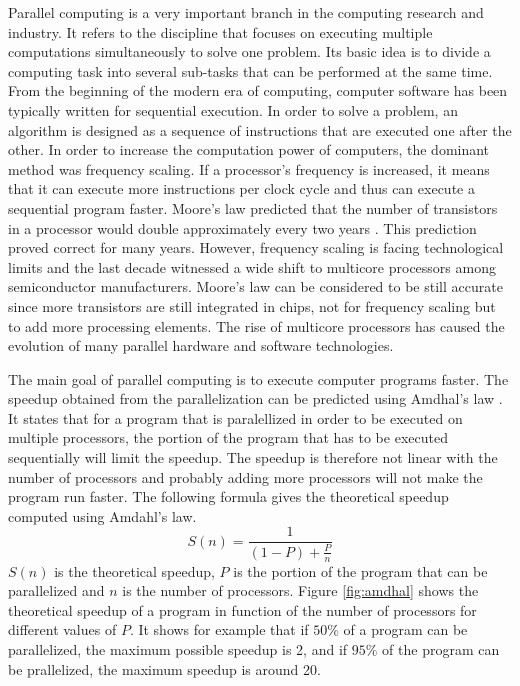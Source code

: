 Parallel computing is a very important branch in the computing research and industry. It refers to the discipline that focuses on executing multiple computations simultaneously to solve one problem. Its basic idea is to divide a computing task into several sub-tasks that can be performed at the same time. From the beginning of the modern era of computing, computer software has been typically written for sequential execution. In order to solve a problem, an algorithm is designed as a sequence of instructions that are executed one after the other. In order to increase the computation power of computers, the dominant method was frequency scaling. If a processor's frequency is increased, it means that it can execute more instructions per clock cycle and thus can execute a sequential program faster. Moore's law predicted that the number of transistors in a processor would double approximately every two years \cite{moore:1965}. This prediction proved correct for many years. However, frequency scaling is facing technological limits and the last decade witnessed a wide shift to multicore processors among semiconductor manufacturers. Moore's law can be considered to be still accurate since more transistors are still integrated in chips, not for frequency scaling but to add more processing elements. The rise of multicore processors has caused the evolution of many parallel hardware and software technologies.

The main goal of parallel computing is to execute computer programs faster. The speedup obtained from the parallelization can be predicted using Amdhal's law \cite{amdahl:1967}. It states that for a program that is paralellized in order to be executed on multiple processors, the portion of the program that has to be executed sequentially will limit the speedup. The speedup is therefore not linear with the number of processors and probably adding more processors will not make the program run faster. The following formula gives the theoretical speedup computed using Amdahl's law.
\begin{equation}
S(n) = \frac{1}{(1-P) + \frac{P}{n}}
\end{equation}
$S(n)$ is the theoretical speedup, $P$ is the portion of the program that can be parallelized and $n$ is the number of processors. Figure \ref{fig:amdhal} shows the theoretical speedup of a program in function of the number of processors for different values of $P$. It shows for example that if $50\%$ of a program can be parallelized, the maximum possible speedup is 2, and if $95\%$ of the program can be prallelized, the maximum speedup is around 20.

